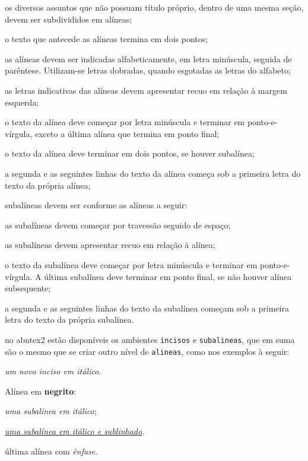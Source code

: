 \begin{alineas}%
\item os diversos assuntos que não possuam título próprio, dentro de uma mesma seção, devem ser subdivididos em alíneas;
\item o texto que antecede as alíneas termina em dois pontos;
\item as alíneas devem ser indicadas alfabeticamente, em letra minúscula, seguida de parêntese. Utilizam-se letras dobradas, quando esgotadas as letras do alfabeto;
\item as letras indicativas das alíneas devem apresentar recuo em relação à margem esquerda;
\item o texto da alínea deve começar por letra minúscula e terminar em ponto-e-vírgula, exceto a última alínea que termina em ponto final;
\item o texto da alínea deve terminar em dois pontos, se houver subalínea;
\item a segunda e as seguintes linhas do texto da alínea começa sob a primeira letra do texto da própria alínea;
\item subalíneas \cite[subseção 4.3]{NBR6024:2012} devem ser conforme as alíneas a seguir:
\begin{alineas}%
\item as subalíneas devem começar por travessão seguido de espaço;
\item as subalíneas devem apresentar recuo em relação à alínea;
\item o texto da subalínea deve começar por letra minúscula e terminar em ponto-e-vírgula. A última subalínea deve terminar em ponto final, se não houver alínea subsequente;
\item a segunda e as seguintes linhas do texto da subalínea começam sob a primeira letra do texto da própria subalínea.
\end{alineas}
\item no \gls{abntex2} estão disponíveis os ambientes \texttt{incisos} e \texttt{subalineas}, que em suma são o mesmo que se criar outro nível de \texttt{alineas}, como nos exemplos à seguir:
\begin{incisos}%
\item \textit{um novo inciso em itálico}.
\end{incisos}
\item Alínea em \textbf{negrito}:
\begin{subalineas}%
\item \textit{uma subalínea em itálico};
\item \underline{\textit{uma subalínea em itálico e sublinhado}}.
\end{subalineas}
\item última alínea com \emph{ênfase}.
\end{alineas}

